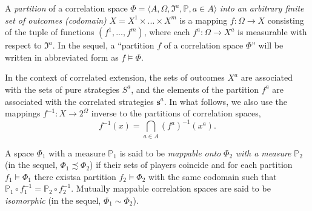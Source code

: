 \begin{definition}
	A \emph{partition} of a correlation space $\Phi = \langle A, \Omega, \mathfrak{I}^a, \mathbb{P}, a \in A \rangle$ \emph{into an arbitrary finite set of outcomes (codomain)} $X = X^1 \times ... \times X^m$ is a mapping $f : \Omega \rightarrow X$ consisting of the tuple of functions $(f^1, ..., f^m)$, where each $f^a : \Omega \rightarrow X^a$ is measurable with respect to $\mathfrak{I}^a$. In the sequel, a “partition $f$ of a correlation space $\Phi$” will be written in abbreviated form as $f \models \Phi$. %
\end{definition}

In the context of correlated extension, the sets of outcomes $X^a$ are associated with the sets of pure strategies $S^a$, and the elements of the partition $f^a$ are associated with the correlated strategies $\mathbf{s}^a$. In what follows, we also use the mappings $f^{-1} : X \rightarrow 2^\Omega$ inverse to the partitions of correlation spaces, %
\begin{equation*}
	f^{-1}(x) = \bigcap_{a \in A} (f^a)^{-1}(x^a).
\end{equation*}
\begin{definition}
	A space $\Phi_1$ with a measure $\mathbb{P}_1$ is said to be \emph{mappable onto} $\Phi_2$ \emph{with a measure} $\mathbb{P}_2$ (in the sequel, $\Phi_1 \precsim \Phi_2$) if their sets of players coincide and for each partition $f_1 \models \Phi_1$ there existsa partition $f_2 \models \Phi_2$ with the same codomain such that $\mathbb{P}_1 \circ f_1^{-1} = \mathbb{P}_2 \circ f_2^{-1}$. Mutually mappable correlation spaces are said to be \emph{isomorphic} (in the sequel, $\Phi_1 \sim \Phi_2$). %
\end{definition}

